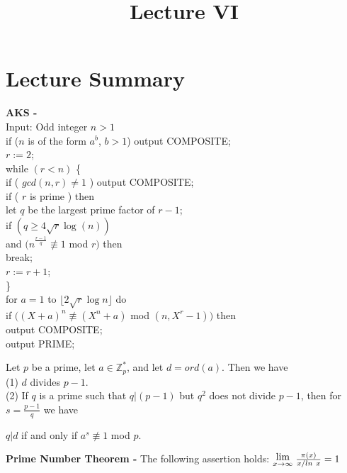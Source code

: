 \documentclass[a4paper]{article}
\title{\vspace{-2cm}Lecture VI\vspace{-2cm}}
\date{}
\newcommand{\Lim}[1]{\raisebox{0.5ex}{{$\displaystyle \lim_{#1}\;$}}}
\begin{document}
\maketitle
\section{Lecture Summary}
\begin{algorithm}
\textbf{AKS -} \\
Input: Odd integer $n > 1$ \\
if ($n$ is of the form $a^{b}$, $b > 1$) output COMPOSITE; \\
$r := 2$; \\
while $( r < n )$ \{\\
\indent if ( $gcd(n,r) \neq 1$ ) output COMPOSITE; \\
\indent if ( $r$ is prime ) then \\
\indent \indent let $q$ be the largest prime factor of $r - 1$; \\
\indent \indent if $( q \geq 4 \sqrt{r} \log(n) )$ \\
\indent \indent and $( n^{\frac{r - 1}{q}} \not \equiv 1$ mod $r )$ then \\
\indent \indent \indent break; \\
$r := r + 1$; \\
\} \\
for $a = 1$ to $\lfloor 2 \sqrt{r} \log{n} \rfloor$ do \\
\indent if $( (X + a)^{n} \not \equiv (X^{n} + a)$ mod $(n, X^{r} - 1) )$ then\\
\indent output COMPOSITE; \\
output PRIME;
\end{algorithm}


\begin{lemma}
Let $p$ be a prime, let $a \in \mathbb{Z}_{p}^{*}$, and let $d = ord(a)$. Then we have\\
(1) $d$ divides $p - 1$. \\
(2) If $q$ is a prime such that $q|(p - 1)$ but $q^{2}$ does not divide $p - 1$, then for $s = \frac{p - 1}{q}$ we have
\begin{center}
$q|d$ if and only if $a^{s} \not \equiv 1$ mod $p$.
\end{center}
\end{lemma}


\begin{theorem}
\textbf{Prime Number Theorem -} The following assertion holds: $\Lim{x \to \infty}{\frac{\pi (x)}{x/ ln\ x}} = 1$
\end{theorem}
\end{document}

